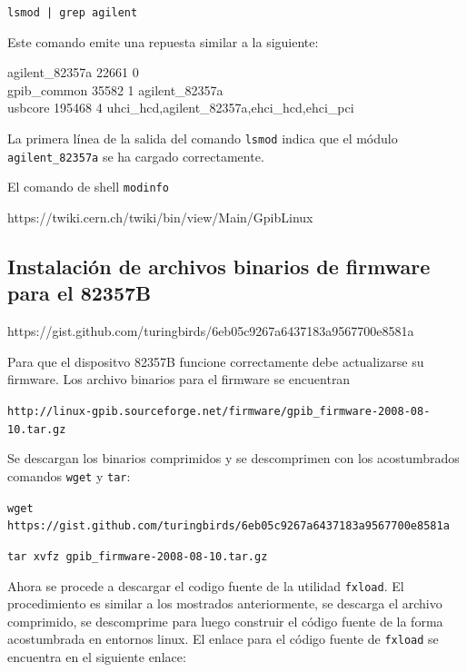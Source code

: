 \documentclass[paper=letter,oneside,fontsize=11pt, parskip=full]{scrartcl}
\begin{document}
		\texttt{lsmod | grep agilent}
		
		Este comando emite una repuesta similar a la siguiente:

		\begin{flushleft}			
		\begin{ttfamily}	
			agilent\_82357a	22661  0 \\				
			gpib\_common	35582  1 agilent\_82357a  \\				
			usbcore	195468  4 uhci\_hcd,agilent\_82357a,ehci\_hcd,ehci\_pci \\
		\end{ttfamily}
		\end{flushleft}
		
		La primera línea de la salida del comando \texttt{lsmod} indica que el módulo \texttt{agilent\_82357a} se ha cargado correctamente. 	
		
		El comando de shell \texttt{modinfo} 
		
		https://twiki.cern.ch/twiki/bin/view/Main/GpibLinux
		
		\subsection{Instalación de archivos binarios de firmware para el 82357B}
		
		https://gist.github.com/turingbirds/6eb05c9267a6437183a9567700e8581a
		
		Para que el dispositvo 82357B funcione correctamente debe actualizarse su firmware. Los archivo binarios para el firmware se encuentran 
		
		\texttt{http://linux-gpib.sourceforge.net/firmware/gpib\_firmware-2008-08-10.tar.gz}
		
		Se descargan los binarios comprimidos y se descomprimen con los acostumbrados comandos \texttt{wget} y \texttt{tar}:
		
		\texttt{wget 		https://gist.github.com/turingbirds/6eb05c9267a6437183a9567700e8581a}
		
		\texttt{tar xvfz gpib\_firmware-2008-08-10.tar.gz}
		
		Ahora se procede a descargar el codigo fuente de la utilidad \texttt{fxload}. El procedimiento es similar a los mostrados anteriormente, se descarga el archivo comprimido, se descomprime para luego construir el código fuente de la forma acostumbrada en entornos linux. El enlace para el código fuente de \texttt{fxload} se encuentra en el siguiente enlace:
		
\end{document}
